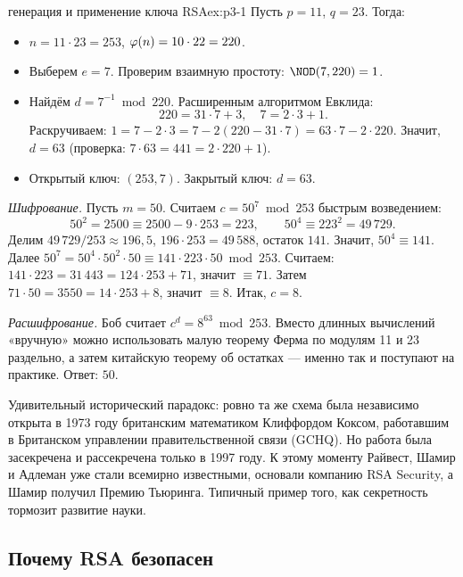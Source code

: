 \begin{example}{генерация и применение ключа RSA}{ex:p3-1}
Пусть $p = 11$, $q = 23$. Тогда:
\begin{itemize}
  \item $n = 11\cdot 23 = 253$, $\varphi(n) = 10\cdot 22 = 220$.
  \item Выберем $e = 7$. Проверим взаимную простоту: $\NOD(7, 220) = 1$.
  \item Найдём $d = 7^{-1} \bmod 220$. Расширенным алгоритмом Евклида:
  \[
  220 = 31\cdot 7 + 3,\quad 7 = 2\cdot 3 + 1.
  \]
  Раскручиваем: $1 = 7 - 2\cdot 3 = 7 - 2(220 - 31\cdot 7) = 63\cdot 7 - 2\cdot 220$. Значит, $d = 63$ (проверка: $7\cdot 63 = 441 = 2\cdot 220 + 1$).
  \item Открытый ключ: $(253, 7)$. Закрытый ключ: $d = 63$.
\end{itemize}

\emph{Шифрование.} Пусть $m = 50$. Считаем $c = 50^7 \bmod 253$ быстрым возведением:
\[
50^2 = 2500 \equiv 2500 - 9\cdot 253 = 223,\qquad 50^4 \equiv 223^2 = 49\,729.
\]
Делим $49\,729 / 253 \approx 196{,}5$, $196\cdot 253 = 49\,588$, остаток $141$. Значит, $50^4 \equiv 141$. Далее $50^7 = 50^4\cdot 50^2\cdot 50 \equiv 141\cdot 223\cdot 50 \bmod 253$. Считаем: $141\cdot 223 = 31\,443 = 124\cdot 253 + 71$, значит $\equiv 71$. Затем $71\cdot 50 = 3550 = 14\cdot 253 + 8$, значит $\equiv 8$. Итак, $c = 8$.

\emph{Расшифрование.} Боб считает $c^d = 8^{63} \bmod 253$. Вместо длинных вычислений «вручную» можно использовать малую теорему Ферма по модулям 11 и 23 раздельно, а затем китайскую теорему об остатках --- именно так и поступают на практике. Ответ: $50$.
\end{example}

\begin{interestbox}
Удивительный исторический парадокс: ровно та же схема была независимо открыта в 1973 году британским математиком Клиффордом Коксом, работавшим в Британском управлении правительственной связи (GCHQ). Но работа была засекречена и рассекречена только в 1997 году. К этому моменту Райвест, Шамир и Адлеман уже стали всемирно известными, основали компанию RSA Security, а Шамир получил Премию Тьюринга. Типичный пример того, как секретность тормозит развитие науки.
\end{interestbox}

\subsection{Почему RSA безопасен}

